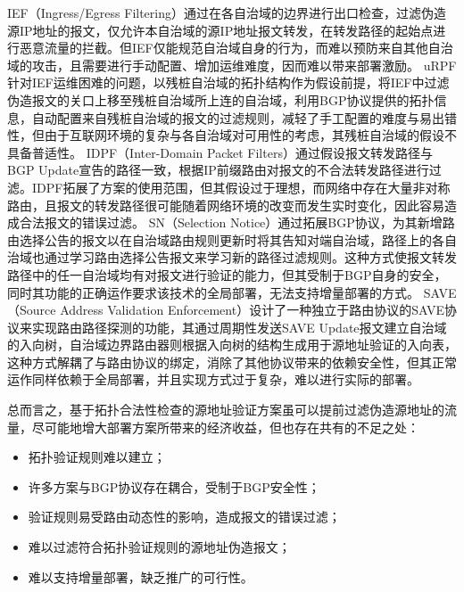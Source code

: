       IEF（Ingress/Egress Filtering）\cite{RFC2827}通过在各自治域的边界进行出口检查，过滤伪造源IP地址的报文，仅允许本自治域的源IP地址报文转发，在转发路径的起始点进行恶意流量的拦截。但IEF仅能规范自治域自身的行为，而难以预防来自其他自治域的攻击，且需要进行手动配置、增加运维难度，因而难以带来部署激励。
      uRPF\cite{uRPF}针对IEF运维困难的问题，以残桩自治域的拓扑结构作为假设前提，将IEF中过滤伪造报文的关口上移至残桩自治域所上连的自治域，利用BGP协议提供的拓扑信息，自动配置来自残桩自治域的报文的过滤规则，减轻了手工配置的难度与易出错性，但由于互联网环境的复杂与各自治域对可用性的考虑，其残桩自治域的假设不具备普适性。
      IDPF（Inter-Domain Packet Filters）\cite{duan2006constructing}通过假设报文转发路径与BGP Update宣告的路径一致，根据IP前缀路由对报文的不合法转发路径进行过滤。IDPF拓展了方案的使用范围，但其假设过于理想，而网络中存在大量非对称路由，且报文的转发路径很可能随着网络环境的改变而发生实时变化，因此容易造成合法报文的错误过滤。
      SN（Selection Notice）\cite{lijun2006bgp}通过拓展BGP协议，为其新增路由选择公告的报文以在自治域路由规则更新时将其告知对端自治域，路径上的各自治域也通过学习路由选择公告报文来学习新的路径过滤规则。这种方式使报文转发路径中的任一自治域均有对报文进行验证的能力，但其受制于BGP自身的安全，同时其功能的正确运作要求该技术的全局部署，无法支持增量部署的方式。
      SAVE（Source Address Validation Enforcement）\cite{li2002save}设计了一种独立于路由协议的SAVE协议来实现路由路径探测的功能，其通过周期性发送SAVE Update报文建立自治域的入向树，自治域边界路由器则根据入向树的结构生成用于源地址验证的入向表，这种方式解耦了与路由协议的绑定，消除了其他协议带来的依赖安全性，但其正常运作同样依赖于全局部署，并且实现方式过于复杂，难以进行实际的部署。

      总而言之，基于拓扑合法性检查的源地址验证方案虽可以提前过滤伪造源地址的流量，尽可能地增大部署方案所带来的经济收益，但也存在共有的不足之处：
      \begin{itemize}
        \item 拓扑验证规则难以建立；
        \item 许多方案与BGP协议存在耦合，受制于BGP安全性；
        \item 验证规则易受路由动态性的影响，造成报文的错误过滤；
        \item 难以过滤符合拓扑验证规则的源地址伪造报文；
        \item 难以支持增量部署，缺乏推广的可行性。
      \end{itemize}

